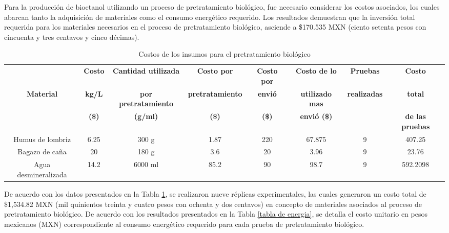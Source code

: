\documentclass[12pt]{article}
\begin{document}
			
Para la producción de bioetanol utilizando un proceso de pretratamiento biológico, fue necesario considerar los costos asociados, los cuales abarcan tanto la adquisición de materiales como el consumo energético requerido. Los resultados demuestran que la inversión total requerida para los materiales necesarios en el proceso de pretratamiento biológico, asciende a \$170.535 MXN (ciento setenta pesos con cincuenta y tres centavos y cinco décimas).
		\begin{table}[H]
		\centering
		\caption{Costos de los insumos para el pretratamiento biológico}
		\label{Costo para pretratamiento biologico}
		\resizebox{16cm}{!} {
			\begin{tabular}{|c|c|c|c|c|c|c|c|}
				\hline
				& \textbf{Costo}& \textbf{Cantidad utilizada } &\textbf{Costo por }  &\textbf{Costo por }  & \textbf{Costo de lo }  &\textbf{Pruebas} & \textbf{Costo } \\
				\textbf{Material}&	\textbf{kg/L} & 	\textbf{por pretratamiento} & \textbf{pretratamiento} & \textbf{envió} & \textbf{utilizado mas }  & \textbf{realizadas } & \textbf{total }  \\
				& 	\textbf{(\$)}	& \textbf{(g/ml)} &\textbf{(\$)} &\textbf{(\$)}  & \textbf{envió (\$)} & & \textbf{de las pruebas}\\ \hline		
				Humus de lombriz    &6.25& 300 g & 1.87& 220 & 67.875& 9 & 407.25\\ \hline
				Bagazo de caña 	    &20  & 180 g  &3.6  & 20 & 3.96 & 9  &23.76\\ \hline
				Agua desmineralizada&14.2& 6000 ml& 85.2 & 90 & 98.7 & 9 & 592.2098  \\ \hline
		\end{tabular} }

	\end{table}
	
De acuerdo con los datos presentados en la Tabla \ref{Costo para pretratamiento biologico}, se realizaron nueve réplicas experimentales, las cuales generaron un costo total de \$1,534.82 MXN (mil quinientos treinta y cuatro pesos con ochenta y dos centavos) en concepto de materiales asociados al proceso de pretratamiento biológico.
De acuerdo con los resultados presentados en la Tabla \ref{tabla de energia}, se detalla el costo unitario en pesos mexicanos (MXN) correspondiente al consumo energético requerido para cada prueba de pretratamiento biológico.
	
\end{document}
